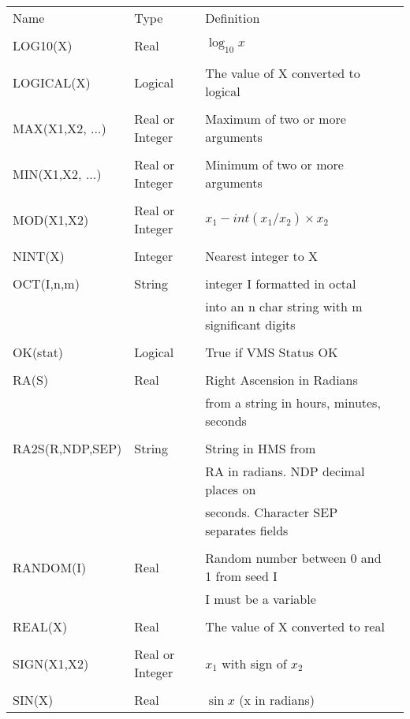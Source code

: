 \documentclass[twoside,11pt]{report}
\begin{document}
\newpage
\begin{center}
\begin{tabular}{llll}
Name & Type & Definition \\
\\
LOG10(X) & Real & $\log_{10} x $\\
\\
LOGICAL(X) & Logical & The value of X converted to logical \\
\\
MAX(X1,X2, ...) & Real or Integer & Maximum of two or more arguments \\
\\
MIN(X1,X2, ...) & Real or Integer & Minimum of two or more arguments \\
\\
MOD(X1,X2) & Real or Integer & $x_{1} - int(x_{1}/x_{2}) \times x_{2}$ \\
\\
NINT(X) & Integer & Nearest integer to X \\
\\
OCT(I,n,m) & String & integer I formatted in octal \\
 & & into an n char string with m significant digits \\
\\
OK(stat) & Logical & True if VMS Status OK \\
\\
RA(S) & Real & Right Ascension in Radians \\
  & & from a string in hours, minutes, seconds \\
\\                                                       
RA2S(R,NDP,SEP) & String & String in HMS from \\
  & & RA in radians. NDP decimal places on \\
  & & seconds. Character SEP separates fields \\
\\
RANDOM(I) & Real & Random number between 0 and 1 from seed I \\
     & &  I must be a variable \\
\\
REAL(X) & Real & The value of X converted to real\\
\\
SIGN(X1,X2) & Real or Integer & $x_{1}$ with sign of $x_{2}$ \\
\\
SIN(X) & Real & $\sin x$ (x in radians) \\

\end{tabular}
\end{center}
\end{document}
